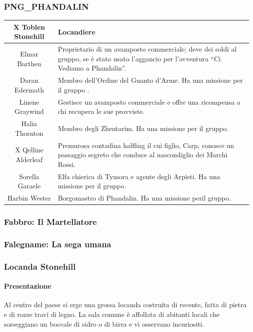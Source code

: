 \documentclass{article}
\begin{document}
\subsubsection{PNG\_PHANDALIN}
\begin{table}[h]
    
    \begin{tabular}{|c|p{10cm}|}
        \hline
      X Toblen Stonehill &  Locandiere\\
       \hline
Elmar Barthen  & Proprietario di un avamposto commerciale;
deve dei soldi al gruppo, se è stato usato
l’aggancio per l'avventura “Ci Vediamo a
Phandalin”.   \\
    \hline
        Daran Edermath & Membro dell'Ordine del Guanto d’Arme. Ha
una missione per il gruppo .\\
    \hline
    Linene Graywind & Gestisce un avamposto commerciale e
offre una ricompensa a chi recupera le sue
provviste.\\
    \hline
    Halia Thornton & Membro degli Zhentarim. Ha una missione
per il gruppo.\\ \hline
X Qelline Alderleaf & Premurosa contadina halfling il cui figlio,
Carp, conosce un passaggio segreto che
conduce al nascondiglio dei Marchi Rossi.\\ \hline
Sorella Garaele & Elfa chierica di Tymora e agente degli Arpisti.
Ha una missione per il gruppo. \\ \hline
Harbin Wester & Borgomastro di Phandalin. Ha una missione
peril gruppo. \\ \hline
    \end{tabular}
\end{table}



\subsubsection{Fabbro: Il Martellatore}
\subsubsection{Falegname: La sega umana}

\subsubsection{Locanda Stonehill}
\paragraph{Presentazione}
Al centro del paese si erge una grossa locanda costruita di
recente, fatta di pietra e di rozze travi di legno. La sala comune
è affollata di abitanti locali che sorseggiano un boccale di sidro
o di birra e vi osservano incuriositi.
\end{document}
